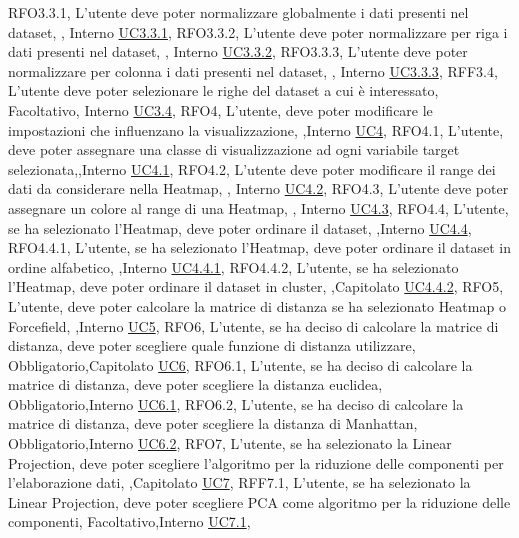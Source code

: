 {    {RFO3.3.1, L'utente deve poter normalizzare globalmente i dati presenti nel dataset, \obb, Interno \noexpand\hyperref[uc3.3.1]{UC3.3.1}},
    {RFO3.3.2, L'utente deve poter normalizzare per riga i dati presenti nel dataset, \obb, Interno \noexpand\hyperref[uc3.3.2]{UC3.3.2}},
    {RFO3.3.3, L'utente deve poter normalizzare per colonna i dati presenti nel dataset, \obb, Interno \noexpand\hyperref[uc3.3.3]{UC3.3.3}},
    {RFF3.4, L'utente deve poter selezionare le righe del dataset a cui è interessato, Facoltativo, Interno \noexpand\hyperref[uc3.4]{UC3.4}},
    {RFO4, L'utente{,} deve poter modificare le impostazioni che influenzano la visualizzazione, \obb,Interno \noexpand\hyperref[uc4]{UC4}},
    {RFO4.1, L'utente{,} deve poter assegnare una classe di visualizzazione ad ogni variabile target selezionata,\obb,Interno \noexpand\hyperref[uc4.1]{UC4.1}},
    {RFO4.2, L'utente deve poter modificare il range dei dati da considerare nella Heatmap, \obb, Interno \noexpand\hyperref[uc4.2]{UC4.2}},
    {RFO4.3, L'utente deve poter assegnare un colore al range di una Heatmap, \obb, Interno \noexpand\hyperref[uc4.3]{UC4.3}},
     {RFO4.4, L'utente{,} se ha selezionato l'Heatmap{,} deve poter ordinare il dataset, \obb,Interno \noexpand\hyperref[uc4.4]{UC4.4}},
    {RFO4.4.1, L'utente{,} se ha selezionato l'Heatmap{,} deve poter ordinare il dataset in ordine alfabetico, \obb,Interno \noexpand\hyperref[uc4.4.1]{UC4.4.1}},
    {RFO4.4.2, L'utente{,} se ha selezionato l'Heatmap{,} deve poter ordinare il dataset in cluster, \obb,Capitolato \noexpand\hyperref[uc4.4.2]{UC4.4.2}},
    {RFO5, L'utente{,} deve poter calcolare la matrice di distanza se ha selezionato Heatmap o Forcefield, \obb,Interno \noexpand\hyperref[uc5]{UC5}},
    {RFO6, L'utente{,} se ha deciso di calcolare la matrice di distanza{,} deve poter scegliere quale funzione di distanza utilizzare, Obbligatorio,Capitolato \noexpand\hyperref[uc6]{UC6}},
    {RFO6.1, L'utente{,} se ha deciso di calcolare la matrice di distanza{,} deve poter scegliere la distanza euclidea, Obbligatorio,Interno \noexpand\hyperref[uc6.1]{UC6.1}},
    {RFO6.2, L'utente{,} se ha deciso di calcolare la matrice di distanza{,} deve poter scegliere la distanza di Manhattan, Obbligatorio,Interno \noexpand\hyperref[uc6.2]{UC6.2}},
    {RFO7, L'utente{,} se ha selezionato la Linear Projection{,} deve poter scegliere l'algoritmo per la riduzione delle componenti per l'elaborazione dati, \obb,Capitolato \noexpand\hyperref[uc7]{UC7}},
    {RFF7.1, L'utente{,} se ha selezionato la Linear Projection{,} deve poter scegliere PCA come algoritmo per la riduzione delle componenti, Facoltativo,Interno \noexpand\hyperref[uc7.1]{UC7.1}},
}
